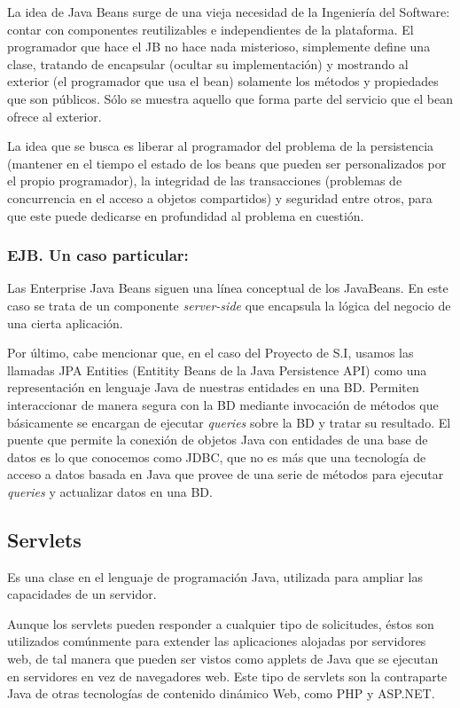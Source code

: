 \documentclass{apuntes}
\begin{document}
La idea de Java Beans surge de una vieja necesidad de la Ingeniería del Software: contar con componentes reutilizables e independientes de la plataforma. El programador que hace el JB no hace nada misterioso, simplemente define una clase, tratando de encapsular (ocultar su implementación) y mostrando al exterior (el programador que usa el bean) solamente los métodos y propiedades que son públicos. Sólo se muestra aquello que forma parte del servicio que el bean ofrece al exterior.

La idea que se busca es liberar al programador del problema de la persistencia (mantener en el tiempo el estado de los beans que pueden ser personalizados por el propio programador), la integridad de las transacciones (problemas de concurrencia en el acceso a  objetos compartidos) y seguridad entre otros, para que este puede dedicarse en profundidad al problema en cuestión.


\subsubsection{EJB. Un caso particular:}
Las Enterprise Java Beans siguen una línea conceptual de los JavaBeans. En este caso se trata de un componente \emph{server-side} que encapsula la lógica del negocio de una cierta aplicación.\newline

 Por último, cabe mencionar que, en el caso del Proyecto de S.I, usamos las llamadas JPA Entities (Entitity Beans de la Java Persistence API) como  una representación en lenguaje Java de nuestras entidades en una BD. Permiten interaccionar de manera segura con  la BD mediante invocación de métodos  que básicamente se encargan de ejecutar \emph{queries} sobre la BD y tratar su resultado. El puente que permite la conexión de objetos Java con entidades de una base de datos es lo que conocemos como JDBC, que no es más que una tecnología de acceso a datos basada en Java que provee de una serie de métodos para ejecutar \emph{queries} y actualizar datos en una BD. 
\subsection{Servlets}
\begin{defn}[Servlet]
Es una clase en el lenguaje de programación Java, utilizada para ampliar las capacidades de un servidor.
\end{defn}

Aunque los servlets pueden responder a cualquier tipo de solicitudes, éstos son utilizados comúnmente para extender las aplicaciones alojadas por servidores web, de tal manera que pueden ser vistos como applets de Java que se ejecutan en servidores en vez de navegadores web. Este tipo de servlets son la contraparte Java de otras tecnologías de contenido dinámico Web, como PHP y ASP.NET.
\end{document}
